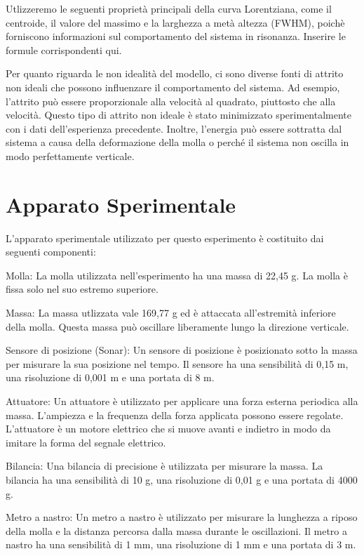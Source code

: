 \documentclass[12pt]{article}
\begin{document}
Utlizzeremo le seguenti proprietà principali della curva Lorentziana, come il centroide, 
il valore del massimo e la larghezza a metà altezza (FWHM), poichè forniscono informazioni 
sul comportamento del sistema in risonanza. Inserire le formule corrispondenti qui.

Per quanto riguarda le non idealità del modello, ci sono diverse fonti di attrito non 
ideali che possono influenzare il comportamento del sistema. Ad esempio, l'attrito può 
essere proporzionale alla velocità al quadrato, piuttosto che alla velocità. Questo tipo di 
attrito non ideale è stato minimizzato sperimentalmente con i dati dell'esperienza precedente. 
Inoltre, l'energia può essere sottratta dal sistema a causa della deformazione della molla o 
perché il sistema non oscilla in modo perfettamente verticale.

\section{Apparato Sperimentale}
L'apparato sperimentale utilizzato per questo esperimento è costituito dai seguenti componenti:

Molla: La molla utilizzata nell'esperimento ha una massa di 22,45 g. 
La molla è fissa solo nel suo estremo superiore.

Massa: La massa utlizzata vale 169,77 g ed è attaccata all'estremità inferiore della molla. 
Questa massa può oscillare liberamente lungo la direzione verticale.

Sensore di posizione (Sonar): Un sensore di posizione è posizionato sotto la massa per misurare la sua posizione nel tempo. Il sensore ha una sensibilità di 0,15 m, una risoluzione di 0,001 m e una portata di 8 m.

Attuatore: Un attuatore è utilizzato per applicare una forza esterna periodica alla massa. 
L'ampiezza e la frequenza della forza applicata possono essere regolate. 
L'attuatore è un motore elettrico che si muove avanti e indietro in modo da imitare la 
forma del segnale elettrico.

Bilancia: Una bilancia di precisione è utilizzata per misurare la massa. 
La bilancia ha una sensibilità di 10 g, una risoluzione di 0,01 g e una portata di 4000 g.

Metro a nastro: Un metro a nastro è utilizzato per misurare la lunghezza a riposo della 
molla e la distanza percorsa dalla massa durante le oscillazioni. Il metro a nastro ha 
una sensibilità di 1 mm, una risoluzione di 1 mm e una portata di 3 m.
\end{document}
